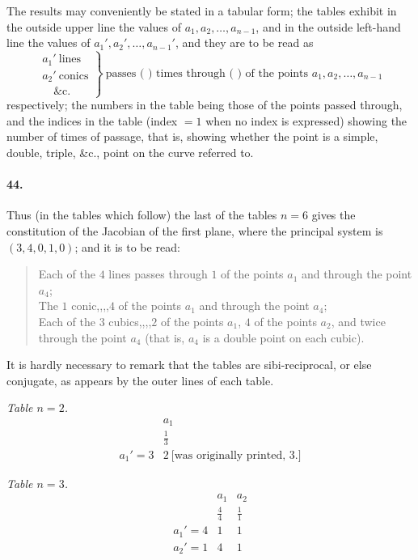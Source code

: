 \documentclass[11pt]{article}
\begin{document}
\medskip

The results may conveniently be stated in a tabular form; the tables
exhibit in the outside upper line the values of
$a_{1},a_{2},\ldots,a_{n-1}$, and in the outside left-hand line the values
of $a_{1}',a_{2}',\ldots,a_{n-1}'$, and they are to be read as
\[
\left.\begin{array}{l}
a_{1}'\ \mathrm{lines}\\
a_{2}'\ \mathrm{conics}\\
\quad\&\mathrm{c.}
\end{array}\right\}\ \text{passes (\ \ ) times through (\ \ ) of the
points } a_{1},a_{2},\ldots,a_{n-1}
\]
respectively; the numbers in the table being those of the points passed
through, and the indices in the table (index $=1$ when no index is
expressed) showing the number of times of passage, that is, showing
whether the point is a simple, double, triple, \&c., point on the curve
referred to.

\medskip

\paragraph{44.}
Thus (in the tables which follow) the last of the tables $n=6$ gives the
constitution of the Jacobian of the first plane, where the principal
system is $(3,4,0,1,0)$; and it is to be read:
\begin{quote}
Each of the $4$ lines passes through $1$ of the points $a_{1}$ and through
the point $a_{4}$;\\
The $1$ conic\quad,,\quad,,\quad $4$ of the points $a_{1}$ and through
the point $a_{4}$;\\
Each of the $3$ cubics\quad,,\quad,,\quad $2$ of the points $a_{1}$, $4$
of the points $a_{2}$, and twice through the point $a_{4}$ (that is,
$a_{4}$ is a double point on each cubic).
\end{quote}
It is hardly necessary to remark that the tables are sibi-reciprocal, or
else conjugate, as appears by the outer lines of each table.

\medskip

\noindent\textit{Table $n=2$.}
\[
\begin{array}{l|c}
        & a_{1}\\
        & \tfrac{1}{3}\\
\hline
a_{1}'=3 & 2\ \text{[was originally printed, }3\text{.]}
\end{array}
\]

\noindent\textit{Table $n=3$.}
\[
\begin{array}{l|cc}
              & a_{1} & a_{2}\\
              & \tfrac{4}{4} & \tfrac{1}{1}\\
\hline
a_{1}'=4      & 1     & 1\\
a_{2}'=1      & 4     & 1
\end{array}
\]
\end{document}
